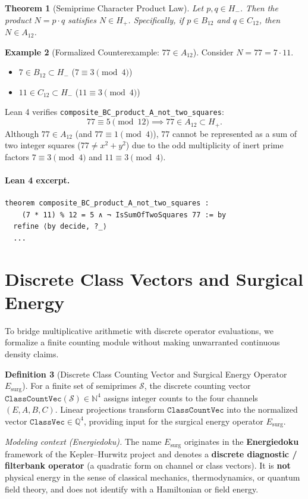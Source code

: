 \documentclass[11pt,a4paper]{article}
\newtheorem{theorem}{Theorem}[section]
\theoremstyle{definition}
\newtheorem{definition}[theorem]{Definition}
\newtheorem{example}[theorem]{Example}
\begin{document}
	\begin{theorem}[Semiprime Character Product Law]
		Let $p, q \in H_-$. Then the product $N = p \cdot q$ satisfies $N \in H_+$. Specifically, if $p \in B_{12}$ and $q \in C_{12}$, then $N \in A_{12}$.
	\end{theorem}
	
	\begin{example}[Formalized Counterexample: $77 \in A_{12}$]
		Consider $N = 77 = 7 \cdot 11$.
		\begin{itemize}
			\item $7 \in B_{12} \subset H_-$ ($7 \equiv 3 \pmod 4$)
			\item $11 \in C_{12} \subset H_-$ ($11 \equiv 3 \pmod 4$)
		\end{itemize}
		Lean 4 verifies \texttt{composite\_BC\_product\_A\_not\_two\_squares}:
		\[
		77 \equiv 5 \pmod{12} \implies 77 \in A_{12} \subset H_+.
		\]
		Although $77 \in A_{12}$ (and $77 \equiv 1 \pmod 4$), $77$ cannot be represented as a sum of two integer squares ($77 \neq x^2 + y^2$) due to the odd multiplicity of inert prime factors $7 \equiv 3 \pmod 4$ and $11 \equiv 3 \pmod 4$.
	\end{example}

	\paragraph{Lean 4 excerpt.}
	\begin{lstlisting}[caption={Excerpt: BC product in $A_{12}$ without two-square representation}]
theorem composite_BC_product_A_not_two_squares :
    (7 * 11) % 12 = 5 ∧ ¬ IsSumOfTwoSquares 77 := by
  refine ⟨by decide, ?_⟩
  ...
	\end{lstlisting}
	
	\section{Discrete Class Vectors and Surgical Energy}
	
	To bridge multiplicative arithmetic with discrete operator evaluations, we formalize a finite counting module without making unwarranted continuous density claims.
	
	\begin{definition}[Discrete Class Counting Vector and Surgical Energy Operator $E_{\mathrm{surg}}$]
		For a finite set of semiprimes $\mathcal{S}$, the discrete counting vector $\mathtt{ClassCountVec}(\mathcal{S}) \in \mathbb{N}^4$ assigns integer counts to the four channels $(E, A, B, C)$. Linear projections transform $\mathtt{ClassCountVec}$ into the normalized vector $\mathtt{ClassVec} \in \mathbb{Q}^4$, providing input for the surgical energy operator $E_{\mathrm{surg}}$.

		\textit{Modeling context (Energiedoku).}
		The name $E_{\mathrm{surg}}$ originates in the \textbf{Energiedoku} framework of the Kepler--Hurwitz project and denotes a
		\textbf{discrete diagnostic / filterbank operator} (a quadratic form on channel or class vectors).
		It is \textbf{not} physical energy in the sense of classical mechanics, thermodynamics, or quantum field theory, and does not identify with a Hamiltonian or field energy.
	\end{definition}
	
\end{document}
